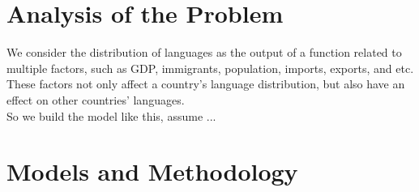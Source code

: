 \documentclass{mcmthesis}
\begin{document}








\section{Analysis of the Problem}
  \indent \indent We consider the distribution of languages as the output of a function related to multiple factors, such as GDP, immigrants, population, imports, exports, and etc. These factors not only affect a country's language distribution, but also have an effect on other countries' languages. \\
  \indent So we build the model like this, assume ...

\section{Models and Methodology}
\end{document}
